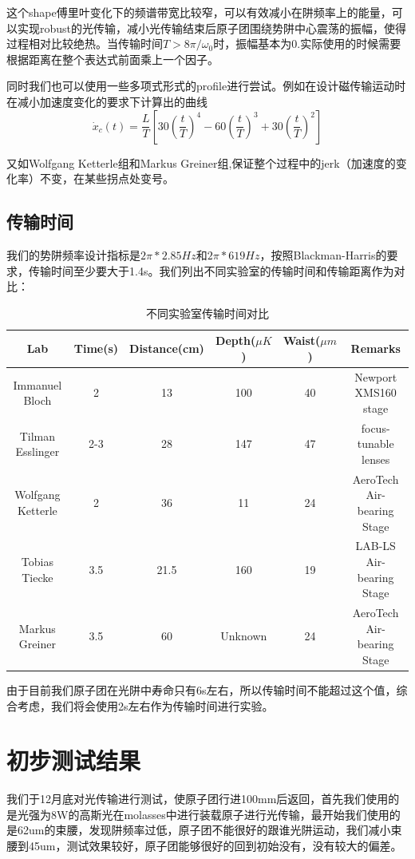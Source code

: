 \documentclass[onecolumn,a4paper,10pt]{article}
\begin{document}
这个shape傅里叶变化下的频谱带宽比较窄，可以有效减小在阱频率上的能量，可以实现robust的光传输，减小光传输结束后原子团围绕势阱中心震荡的振幅，使得过程相对比较绝热。当传输时间$T>8\pi/\omega_{0}$时，振幅基本为0.实际使用的时候需要根据距离在整个表达式前面乘上一个因子。

同时我们也可以使用一些多项式形式的profile进行尝试。例如在设计磁传输运动时在减小加速度变化的要求下计算出的曲线
\begin{equation}
        \dot{x}_{c}(t)= \frac{L}{T}[30(\frac{t}{T})^4-60(\frac{t}{T})^3+30(\frac{t}{T})^2]
\end{equation}

又如Wolfgang Ketterle组\cite{MITTrans}和Markus Greiner组\cite{MarkusTrans},保证整个过程中的jerk（加速度的变化率）不变，在某些拐点处变号。


\subsection{传输时间}
我们的势阱频率设计指标是$2\pi*2.85Hz$和$2\pi*619Hz$，按照Blackman-Harris的要求，传输时间至少要大于1.4s。我们列出不同实验室的传输时间和传输距离作为对比：



\begin{table}[htbp]
\centering
\label{tab2}

\begin{tabular}{|c|c|c|c|c|c|}
\hline
Lab & Time(s)& Distance(cm) &Depth($\mu K$)&Waist($\mu m$)&Remarks\\
\hline
Immanuel Bloch\cite{Singlesite} & 2&13& 100&40&Newport XMS160 stage\\
\hline
Tilman Esslinger\cite{TTrans} & 2-3&28& 147&47&focus-tunable lenses\\
\hline
Wolfgang Ketterle\cite{MITTrans}&2&36&11&24&AeroTech Air-bearing Stage \\
\hline
Tobias Tiecke\cite{Li2DMOT}&3.5&21.5&160&19&LAB-LS Air-bearing Stage \\
\hline
Markus Greiner\cite{MarkusTrans}&3.5&60&Unknown&24&AeroTech Air-bearing Stage \\
\hline

\end{tabular}
\caption{不同实验室传输时间对比}
\end{table}


由于目前我们原子团在光阱中寿命只有6s左右，所以传输时间不能超过这个值，综合考虑，我们将会使用2s左右作为传输时间进行实验。

\section{初步测试结果}
我们于12月底对光传输进行测试，使原子团行进100mm后返回，首先我们使用的是光强为8W的高斯光在molasses中进行装载原子进行光传输，最开始我们使用的是62um的束腰，发现阱频率过低，原子团不能很好的跟谁光阱运动，我们减小束腰到45um，测试效果较好，原子团能够很好的回到初始没有，没有较大的偏差。
\end{document}

